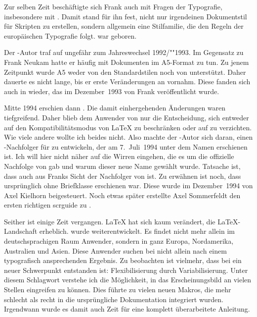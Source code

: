  Zur selben Zeit beschäftigte sich Frank auch mit Fragen der
  Typografie, insbesondere mit \cite{JTsch87}. Damit stand für ihn
  fest, nicht nur irgendeinen Dokumentstil für Skripten zu erstellen,
  sondern allgemein eine Stilfamilie, die den Regeln der europäischen
  Typografie folgt. {\Script} war geboren.
  
  Der \KOMAScript-Autor traf auf {\Script} ungefähr zum Jahreswechsel
  1992/""1993. Im Gegensatz zu Frank Neukam hatte er häufig mit Dokumenten im
  A5-Format zu tun. Zu jenem Zeitpunkt wurde A5 weder von den Standardstilen
  noch von {\Script} unterstützt. Daher dauerte es nicht lange, bis er erste
  Veränderungen an {\Script} vornahm. Diese fanden sich auch in {\ScriptII}
  wieder, das im Dezember~1993 von Frank veröffentlicht wurde.
  
  Mitte 1994 erschien dann \LaTeXe. Die damit einhergehenden Änderungen waren
  tiefgreifend. Daher blieb dem Anwender von {\ScriptII} nur die Entscheidung,
  sich entweder auf den Kompatibilitätsmodus von \LaTeX{} zu beschränken oder
  auf {\Script} zu verzichten. Wie viele andere wollte ich beides nicht. Also
  machte der \KOMAScript-Autor sich daran, einen \Script-Nachfolger für
  {\LaTeXe} zu entwickeln, der am 7.~Juli~1994 unter dem Namen {\KOMAScript}
  erschienen ist. Ich will hier nicht näher auf die Wirren eingehen, die es um
  die offizielle Nachfolge von {\Script} gab und warum dieser neue Name
  gewählt wurde. Tatsache ist, dass auch aus Franks Sicht {\KOMAScript} der
  Nachfolger von {\ScriptII} ist. Zu erwähnen ist noch, dass {\KOMAScript}
  ursprünglich ohne Briefklasse erschienen war. Diese wurde im Dezember~1994
  von Axel Kielhorn beigesteuert. Noch etwas später erstellte Axel Sommerfeldt
  den ersten richtigen scrguide zu {\KOMAScript}.
  
  Seither ist einige Zeit vergangen. {\LaTeX} hat sich kaum verändert, die
  \LaTeX-Landschaft erheblich. {\KOMAScript} wurde weiterentwickelt. Es findet
  nicht mehr allein im deutschsprachigen Raum Anwender, sondern in ganz
  Europa, Nordamerika, Australien und Asien.  Diese Anwender suchen bei
  {\KOMAScript} nicht allein nach einem typografisch ansprechenden
  Ergebnis. Zu beobachten ist vielmehr, dass bei {\KOMAScript} ein neuer
  Schwerpunkt entstanden ist: Flexibilisierung durch Variabilisierung. Unter
  diesem Schlagwort verstehe ich die Möglichkeit, in das Erscheinungsbild an
  vielen Stellen eingreifen zu können. Dies führte zu vielen neuen Makros, die
  mehr schlecht als recht in die ursprüngliche Dokumentation integriert wurden.
  Irgendwann wurde es damit auch Zeit für eine komplett überarbeitete
  Anleitung.


